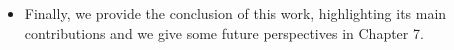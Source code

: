 \begin{itemize}
	\item Finally, we provide the conclusion of this work, highlighting its main contributions and
	we give some future perspectives in Chapter 7.
	
\end{itemize}








